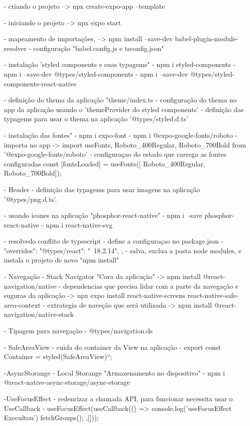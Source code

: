 - criando o projeto --> npx create-expo-app --template

- iniciando o projeto --> npx expo start

- mapeamento de importações, --> npm install --save-dev babel-plugin-module-resolver
- configuração "babel.config.js e tsconfig.json"

- instalação 'styled components e suas typagems"
- npm i styled-components
- npm i --save-dev @types/styled-components
- npm i --save-dev @types/styled-components-react-native

- definição do thema da aplicação "theme/index.ts
- configuração do thema no app da aplicação usando o 'themeProvider do styled components'
- definição das typagems para usar o thema na aplicação '@types/styled.d.ts'

- instalação das fontes"
- npm i expo-font
- npm i @expo-google-fonts/roboto 
- importa no app -> import {useFonts, Roboto_400Regular, Roboto_700Bold } from '@expo-google-fonts/roboto'
- configuraçao do estado que carrega as fontes configuradas const [fontsLoaded] = useFonts([ Roboto_400Regular, Roboto_700Bold]);

- Header
- definição das typagems para usar imagens na aplicação '@types/png.d.ts'.

- usando icones na aplicação "phosphor-react-native"
- npm i --save phosphor-react-native
- npm i react-native-svg


- resolvedo conflito de typescript
- define a configuraçao no package.json
- "overrides": {
    "@types/react": "~18.2.14",
    },
    - salva, exclua a pasta node modules, e instala o projeto de novo "npm install"
    
- Navegação
- Stack Navigator  "Cora da aplicação" -> npm install @react-navigation/native
- dependencias que precisa lidar com a parte da navegação e suguras da aplicação -> npx expo install react-native-screens react-native-safe-area-context
- extrategia de naveção que será utilizada -> npm install @react-navigation/native-stack

- Tipagem para navegação
- @types/navigation.ds

- SafeAreaView
- cuida do container da View na aplicação
- export const Container = styled(SafeAreaView)``;

-AsyncStorange - Local Storange "Armazenamento no dispositivo"
- npm i @react-native-async-storage/async-storage

-UseFocusEffect - redenrizar a chamada API, para funcionar necessita usar o UseCallback
- useFocusEffect(useCallback(() => {
    console.log('useFocusEffect Execultou')
    fetchGroups();
  },[]));


